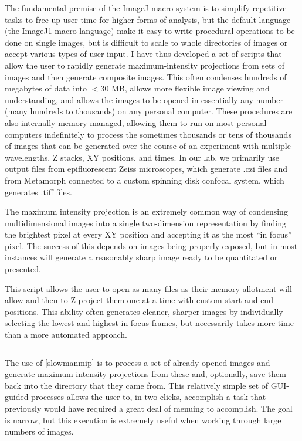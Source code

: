 The fundamental premise of the ImageJ macro system is to simplify repetitive tasks to free up user time for higher forms of analysis, but the default language (the ImageJ1 macro language) make it easy to write procedural operations to be done on single images, but is difficult to scale to whole directories of images or accept various types of user input. I have thus developed a set of scripts that allow the user to rapidly generate maximum-intensity projections from sets of images and then generate composite images. This often condenses hundreds of megabytes of data into $<$30 MB, allows more flexible image viewing and understanding, and allows the images to be opened in essentially any number (many hundreds to thousands) on any personal computer. These procedures are also internally memory managed, allowing them to run on most personal computers indefinitely to process the sometimes thousands or tens of thousands of images that can be generated over the course of an experiment with multiple wavelengths, Z stacks, XY positions, and times. In our lab, we primarily use output files from epifluorescent Zeiss microscopes, which generate .czi files and from Metamorph connected to a custom spinning disk confocal system, which generates .tiff files.

The maximum intensity projection is an extremely common way of condensing multidimensional images into a single two-dimension representation by finding the brightest pixel at every XY position and accepting it as the most ``in focus'' pixel. The success of this depends on images being properly exposed, but in most instances will generate a reasonably sharp image ready to be quantitated or presented.

\begin{code}
\caption{This script allows the user to open as many files as their memory allotment will allow and then to Z project them one at a time with custom start and end positions. This ability often generates cleaner, sharper images by individually selecting the lowest and highest in-focus frames, but necessarily takes more time than a more automated approach.}
\label{slowmanmip}

\inputminted[breaklines,frame=single]{python}{source/manMIPper.py}

\end{code}

The use of \autoref{slowmanmip} is to process a set of already opened images and generate maximum intensity projections from these and, optionally, save them back into the directory that they came from. This relatively simple set of GUI-guided processes allows the user to, in two clicks, accomplish a task that previously would have required a great deal of menuing to accomplish. The goal is narrow, but this execution is extremely useful when working through large numbers of images.

